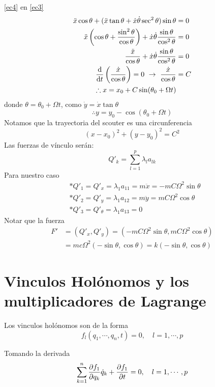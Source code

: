 \documentclass[../main]{subfiles}
\begin{document}
\eqref{ec4} en \eqref{ec3}
\begin{align*}
    \ddot{x}\cos \theta+(\ddot{x}\tan \theta+\dot{x}\dot{\theta}\sec^2 \theta)\sin \theta&=0 \\
    \ddot{x}\left(\cos \theta+\dfrac{\sin^2 \theta}{\cos \theta}\right)+\dot{x}\dot{\theta}\dfrac{\sin \theta}{\cos^2 \theta}&=0 \\
    \dfrac{\ddot{x}}{\cos \theta}+\dot{x}\dot{\theta}\dfrac{\sin \theta}{\cos^2 \theta}&=0 \\
    \dv{}{t}\left(\dfrac{\dot{x}}{\cos \theta}\right)=0 \ \rightarrow \ \dfrac{\dot{x}}{\cos \theta}&=C\\
    \therefore x=x_0+C\sin (\theta_0+\Omega t)
\end{align*}
donde $\theta=\theta_0+\Omega t$, como $\dot{y}=\dot{x}\tan \theta$
\begin{equation*}
    \therefore y=y_0-\cos (\theta_0+\Omega t)
\end{equation*}
Notamos que la trayectoria del scouter es una circunferencia
\begin{equation*}
    (x-x_0)^2+(y-y_0)^2=C^2
\end{equation*}
Las fuerzas de vínculo serán:
\begin{equation*}
    Q'_k=\sum_{l=1}^p \lambda_l a_{lk}
\end{equation*}
Para nuestro caso 
\begin{align*}
    &* Q'_1=Q'_x=\lambda_1 a_{11}=m\ddot{x}=-mC\Omega^2 \sin \theta \\
    &* Q'_2=Q'_y=\lambda_1 a_{12}=m\ddot{y}=mC\Omega^2 \cos \theta \\
    &* Q'_3=Q'_{\theta}=\lambda_1 a_{13}=0
\end{align*}
Notar que la fuerza
\begin{align*}
    F'&=(Q'_x, Q'_y)=(-mC\Omega^2 \sin \theta, mC\Omega^2 \cos \theta)\\
    &=mc\Omega^2(-\sin \theta, \cos \theta)=k(-\sin \theta, \cos \theta)
\end{align*}
\section{Vinculos Holónomos y los multiplicadores de Lagrange}
Los vinculos holónomos son de la forma
\begin{equation}
    f_l (q_1, \cdots, q_n, t)=0, \quad l=1, \cdots, p
\end{equation}

Tomando la derivada
\begin{equation}
    \sum_{k=1}^n \pdv{f_1}{q_k} \dot{q}_k+\pdv{f_1}{t}=0, \quad l=1, \cdots, p
\end{equation}
\end{document}
